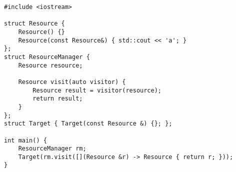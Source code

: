 \begin{lstlisting}[title=\href{https://godbolt.org/z/SQ3mvG}{\texttt{godbolt.org/z/SQ3mvG}}]
#include <iostream>

struct Resource {
    Resource() {}
    Resource(const Resource&) { std::cout << 'a'; }
};
struct ResourceManager {
    Resource resource;
 
    Resource visit(auto visitor) {
        Resource result = visitor(resource);
        return result;
    }
};
struct Target { Target(const Resource &) {}; };

int main() {
    ResourceManager rm;
    Target(rm.visit([](Resource &r) -> Resource { return r; }));
}
\end{lstlisting}
